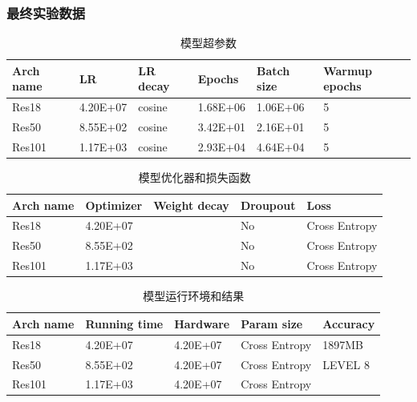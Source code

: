 \documentclass[hyperref, UTF8, 12pt]{article}
\theoremstyle{definition}
\begin{document}
\subsubsection{最终实验数据}
\begin{table}[h]
	\centering
	\caption{模型超参数}
	\begin{tabular}{l|l|l|l|l|l}
		\toprule
		Arch name & LR       & LR decay & Epochs   & Batch size & Warmup epochs \\ \midrule
		Res18     & 4.20E+07 & cosine   & 1.68E+06 & 1.06E+06   & 5             \\ \midrule
		Res50     & 8.55E+02 & cosine   & 3.42E+01 & 2.16E+01   & 5              \\ \midrule
		Res101    & 1.17E+03 & cosine   & 2.93E+04 & 4.64E+04   &  5            \\ \bottomrule
	\end{tabular}
\end{table}

\begin{table}[h]
	\centering
	\caption{模型优化器和损失函数}
	\begin{tabular}{l|l|l|l|l}
		\toprule
		Arch name & Optimizer& Weight decay & Droupout   & Loss           \\ \midrule
		Res18     & 4.20E+07 &         	    & No 	     & Cross Entropy  \\ \midrule
		Res50     & 8.55E+02 &              & No         & Cross Entropy  \\ \midrule
		Res101    & 1.17E+03 &              & No         & Cross Entropy  \\ \bottomrule
	\end{tabular}
\end{table}

\begin{table}[h]
	\centering
	\caption{模型运行环境和结果}
	\begin{tabular}{l|l|l|l|l}
		\toprule
		Arch name & Running time & Hardware     & Param size     & Accuracy 	 \\ \midrule
		Res18     & 4.20E+07     & 4.20E+07     & Cross Entropy  & 1897MB        \\ \midrule
		Res50     & 8.55E+02     & 4.20E+07     & Cross Entropy  & LEVEL 8       \\ \midrule
		Res101    & 1.17E+03     & 4.20E+07      & Cross Entropy &               \\ \bottomrule
	\end{tabular}
\end{table}
\end{document}
